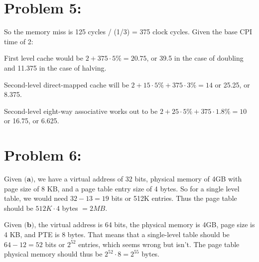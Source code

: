 \documentclass[a4paper]{article}
\begin{document}
\section*{Problem 5:} So the memory miss is 125 cycles / (1/3) = 375 clock cycles. Given the base CPI time of 2:

First level cache would be $2 + 375 \cdot 5\% = 20.75$, or 39.5 in the case of doubling and 11.375 in the case of halving.

Second-level direct-mapped cache will be $2 + 15 \cdot 5\% + 375 \cdot 3\% = 14$ or 25.25, or 8.375.

Second-level eight-way associative works out to be $2 + 25 \cdot 5\% + 375 \cdot 1.8\% = 10$ or 16.75, or 6.625.

\section*{Problem 6:} 

Given $\textbf{(a)}$, we have a virtual address of 32 bits, physical memory of 4GB with page size of 8 KB, and a page table entry size of 4 bytes. So for a single level table, we would need $32-13 = 19$ bits or 512K entries. Thus the page table should be $512K \cdot 4$ bytes $ = 2 MB$.

Given $\textbf{(b)}$, the virtual address is 64 bits, the physical memory is 4GB, page size is 4 KB, and PTE is 8 bytes. That means that a single-level table should be $64-12=52$ bits or $2^{52}$ entries, which seems wrong but isn't. The page table physical memory should thus be $2^{52} \cdot 8 = 2^{55}$ bytes.
\end{document}
